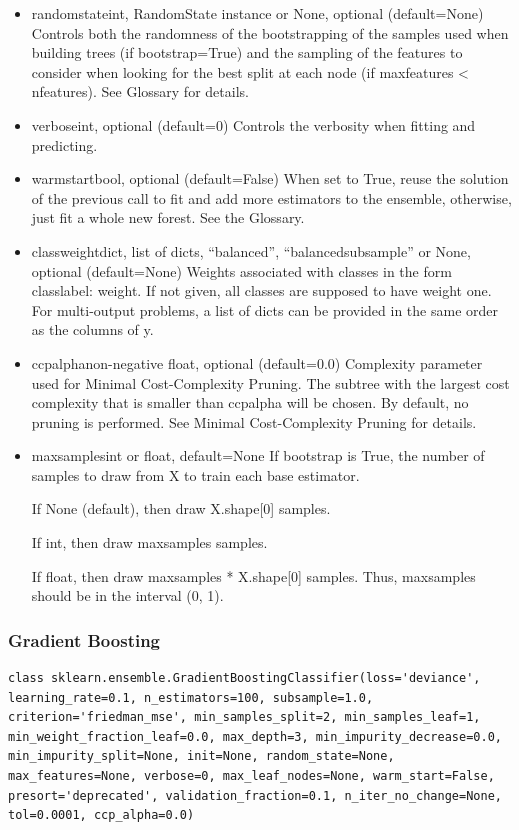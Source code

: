 \documentclass[12pt]{article}
\begin{document}
\begin{itemize}
\item
random\textunderscore stateint, RandomState instance or None, optional (default=None)
Controls both the randomness of the bootstrapping of the samples used when building trees (if bootstrap=True) and the sampling of the features to consider when looking for the best split at each node (if max\textunderscore features < n\textunderscore features). See Glossary for details.

\item
verboseint, optional (default=0)
Controls the verbosity when fitting and predicting.

\item
warm\textunderscore startbool, optional (default=False)
When set to True, reuse the solution of the previous call to fit and add more estimators to the ensemble, otherwise, just fit a whole new forest. See the Glossary.

\item
class\textunderscore weightdict, list of dicts, “balanced”, “balanced\textunderscore subsample” or None, optional (default=None)
Weights associated with classes in the form {class\textunderscore label: weight}. If not given, all classes are supposed to have weight one. For multi-output problems, a list of dicts can be provided in the same order as the columns of y.

\item
ccp\textunderscore alphanon-negative float, optional (default=0.0)
Complexity parameter used for Minimal Cost-Complexity Pruning. The subtree with the largest cost complexity that is smaller than ccp\textunderscore alpha will be chosen. By default, no pruning is performed. See Minimal Cost-Complexity Pruning for details.

\item
max\textunderscore samplesint or float, default=None
If bootstrap is True, the number of samples to draw from X to train each base estimator.

If None (default), then draw X.shape[0] samples.

If int, then draw max\textunderscore samples samples.

If float, then draw max\textunderscore samples * X.shape[0] samples. Thus, max\textunderscore samples should be in the interval (0, 1).

\end{itemize}

\newpage
\subsubsection{Gradient Boosting}
\begin{lstlisting}
class sklearn.ensemble.GradientBoostingClassifier(loss='deviance', learning_rate=0.1, n_estimators=100, subsample=1.0, criterion='friedman_mse', min_samples_split=2, min_samples_leaf=1, min_weight_fraction_leaf=0.0, max_depth=3, min_impurity_decrease=0.0, min_impurity_split=None, init=None, random_state=None, max_features=None, verbose=0, max_leaf_nodes=None, warm_start=False, presort='deprecated', validation_fraction=0.1, n_iter_no_change=None, tol=0.0001, ccp_alpha=0.0)
\end{lstlisting}
\end{document}
